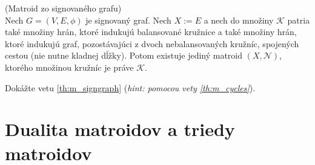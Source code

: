 \begin{theorem}{(Matroid zo signovaného grafu)}\\
\label{th:m_signgraph}
Nech $G = (V,E,\phi)$ je signovaný graf.
Nech $X := E$ a nech do množiny $\mathcal{K}$ patria také množiny hrán, ktoré indukujú balansované kružnice a také množiny hrán, ktoré indukujú graf, pozostávajúci z dvoch nebalansovaných kružníc, spojených cestou (nie nutne kladnej dĺžky).
Potom existuje jediný matroid $(X, \mathcal{N})$, ktorého množinou kružníc je práve $\mathcal{K}$. 
\end{theorem}
\begin{exercise}
Dokážte vetu \ref{th:m_signgraph} (\emph{hint: pomocou vety \ref{th:m_cycles}}).
\end{exercise}

\section{Dualita matroidov a triedy matroidov}

